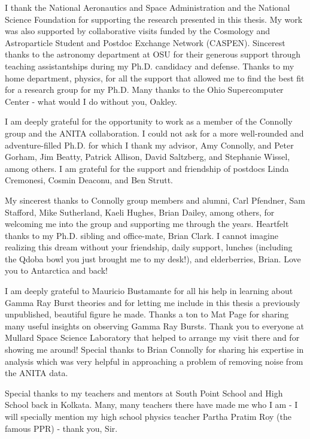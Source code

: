 \begin{acknowledgments}

I thank the National Aeronautics and
Space Administration and the National Science Foundation 
for supporting the research presented in this thesis. 
My work was also supported by collaborative visits funded
by the Cosmology and Astroparticle Student and Postdoc
Exchange Network (CASPEN). Sincerest thanks to the astronomy department at OSU for their generous support through teaching assistantships during my Ph.D. candidacy and defense. 
Thanks to my home department, physics, for all the support that allowed me to find the best fit for a research group for my Ph.D. 
Many thanks to the Ohio Supercomputer Center - what would I do without you, Oakley. 

I am deeply grateful for the opportunity to work as a member of the Connolly group and the ANITA collaboration. I could not ask for a more well-rounded and adventure-filled Ph.D. for which I thank my advisor, Amy Connolly, and Peter Gorham, Jim Beatty, Patrick Allison, David Saltzberg, and Stephanie Wissel, among others. I am grateful for the support and friendship of postdocs Linda Cremonesi, Cosmin Deaconu, and Ben Strutt. 

My sincerest thanks to Connolly group members and alumni, Carl Pfendner, Sam Stafford, Mike Sutherland, Kaeli Hughes, Brian Dailey, among others, for welcoming me into the group and supporting me through the years. Heartfelt thanks to my Ph.D. sibling and office-mate, Brian Clark. I cannot imagine realizing this dream without your friendship, daily support, lunches (including the Qdoba bowl you just brought me to my desk!), and elderberries, Brian. Love you to Antarctica and back! 

I am deeply grateful to Mauricio Bustamante for all his help in learning about Gamma Ray Burst theories and for letting me include in this thesis a previously unpublished, beautiful figure he made. 
Thanks a ton to Mat Page for sharing many useful insights on observing Gamma Ray Bursts. Thank you to everyone at Mullard Space Science Laboratory that helped to arrange my visit there and for showing me around!
Special thanks to Brian Connolly for sharing his expertise in analysis which was very helpful in approaching a problem of removing noise from the ANITA data. 

Special thanks to my teachers and mentors at South Point School and High School back in Kolkata. Many, many teachers there have made me who I am - I will specially mention my high school physics teacher Partha Pratim Roy (the famous PPR) - thank you, Sir. 


\end{acknowledgments}
